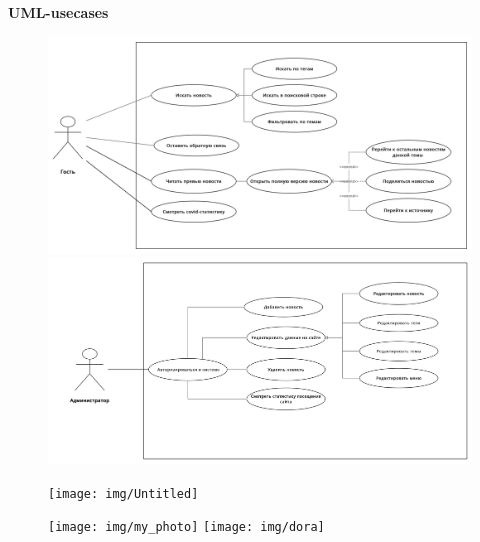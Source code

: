 \begin{center}
    \LARGE
    \textbf{UML-usecases}
    \normalsize
    \begin{figure}[H]
        \centering
        \includegraphics[scale=0.05]{img/Untitled Workspace-2}\\
        \includegraphics[scale=0.08]{img/Untitled Workspace-11}\\
    \end{figure}
\end{center}
\newpage
\BgThispage

\newpage
\BgThispage
\begin{center}
    \begin{figure}[H]
        \centering
        \texttt{[image: img/Untitled]}
    \end{figure}
    \begin{figure}[H]
        \centering
        \texttt{[image: img/my\_photo]}
        \texttt{[image: img/dora]}
    \end{figure}
\end{center}